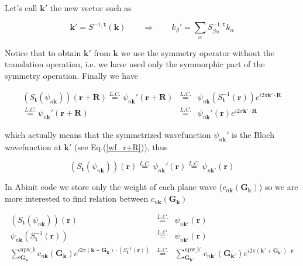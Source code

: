 \documentclass[a4paper,12pt]{report}
\begin{document}
Let's call $\mathbf{k}'$ the new vector such as

\begin{equation}
\mathbf{k}' = S^{-1,\mathtt{t}}\left( \mathbf{k}\right)  \qquad \Rightarrow  \qquad k_{\beta}' = \sum_{\alpha} S_{\beta\alpha}^{-1,\mathtt{t}} k_{\alpha}
\end{equation}

Notice that to obtain $\mathbf{k}'$ from $\mathbf{k}$ we use the symmetry operator without the translation operation, i.e. we have used only the symmorphic part of the symmetry operation.
Finally we have

\begin{eqnarray}
\left( S_{\mathbf{t}} \left( \psi_{n\mathbf{k}}\right) \right) (\mathbf{r}+\mathbf{R}) \stackrel{L.C.}{=}  \psi_{n\mathbf{k}}'(\mathbf{r}+\mathbf{R}) &\stackrel{L.C.}{=}& \psi_{n\mathbf{k}}(S_{\mathbf{t}}^{-1}\left( \mathbf{r}\right)) e^{i2\pi\mathbf{k}'\cdotp\mathbf{R}} \nonumber\\
\stackrel{L.C.}{=} \psi_{n\mathbf{k}}'(\mathbf{r}+\mathbf{R}) &\stackrel{L.C.}{=}& \psi_{n\mathbf{k}}'(\mathbf{r}) e^{i2\pi\mathbf{k}'\cdotp\mathbf{R}}
\end{eqnarray}

which actually means that the symmetrized wavefunction $\psi_{n\mathbf{k}}'$ is the Bloch wavefunction at $\mathbf{k}'$ (see Eq.(\ref{wf_r+R})), thus

\begin{equation}
\left( S_{\mathbf{t}} \left( \psi_{n\mathbf{k}}\right) \right) (\mathbf{r}) \stackrel{L.C.}{=} \psi_{n\mathbf{k}}'(\mathbf{r}) \stackrel{L.C.}{=} \psi_{n\mathbf{k}'}(\mathbf{r}) \label{symrel_psikkprime}
\end{equation}

In Abinit code we store only the weight of each plane wave ($c_{n\mathbf{k}}(\mathbf{G_{\mathbf{k}}})$) so we are more interested to find relation between $c_{n\mathbf{k}}(\mathbf{G_{\mathbf{k}}})$

\begin{eqnarray}
\left( S_{\mathbf{t}} \left( \psi_{n\mathbf{k}}\right) \right) (\mathbf{r}) &\stackrel{L.C.}{=}&  \psi_{n\mathbf{k}'}(\mathbf{r}) \nonumber \\
\psi_{n\mathbf{k}}(S_{\mathbf{t}}^{-1} (\mathbf{r})) &\stackrel{L.C.}{=}&  \psi_{n\mathbf{k}'}(\mathbf{r}) \nonumber \\
\sum_{\mathbf{G_{\mathbf{k}}}}^{\text{npw\_k}} c_{n\mathbf{k}}(\mathbf{G}_{\mathbf{k}}) e^{i2\pi \left(  \mathbf{k} +\mathbf{G}_{\mathbf{k}}\right)\cdotp(S_{\mathbf{t}}^{-1} (\mathbf{r}))} &\stackrel{L.C.}{=}& \sum_{\mathbf{G_{\mathbf{k}'}}}^{\text{npw\_k'}} c_{n\mathbf{k}'}(\mathbf{G}_{\mathbf{k}'}) e^{i2\pi \left(  \mathbf{k}' +\mathbf{G}_{\mathbf{k}'}\right)\cdotp\mathbf{r}}
\end{eqnarray}
\end{document}
